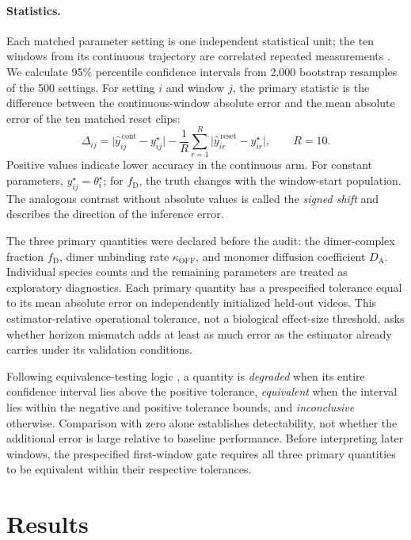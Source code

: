 \documentclass{article}
\newcommand{\fD}{f_{\mathrm{D}}}
\newcommand{\DA}{D_{\mathrm{A}}}
\newcommand{\koff}{\kappa_{\mathrm{OFF}}}
\begin{document}
\paragraph{Statistics.} Each matched parameter setting is one independent
statistical unit; the ten windows from its continuous trajectory are
correlated repeated measurements
\citep{lazic2010pseudoreplication}. We calculate 95\% percentile confidence
intervals from 2,000 bootstrap resamples of the 500 settings. For setting
$i$ and window $j$, the primary statistic is the difference between the
continuous-window absolute error and the mean absolute error of the ten
matched reset clips:
%
\begin{equation}
\Delta_{ij}
= \bigl|\hat y^{\,\mathrm{cont}}_{ij} - y^{\star}_{ij}\bigr|
- \frac{1}{R}\sum_{r=1}^{R}
  \bigl|\hat y^{\,\mathrm{reset}}_{ir} - y^{\star}_{ir}\bigr|,
\qquad R=10.
\label{eq:delta}
\end{equation}
%
Positive values indicate lower accuracy in the continuous arm. For constant
parameters, $y^{\star}_{ij}=\theta^{\star}_{i}$; for $\fD$, the truth changes
with the window-start population. The analogous contrast without absolute
values is called the \emph{signed shift} and describes the direction of the
inference error.

The three primary quantities were declared before the audit: the
dimer-complex fraction $\fD$, dimer unbinding rate $\koff$, and monomer
diffusion coefficient $\DA$. Individual species counts and the remaining
parameters are treated as exploratory diagnostics. Each primary quantity has
a prespecified tolerance equal to its mean absolute error on independently
initialized held-out videos. This estimator-relative operational tolerance, not a biological effect-size
threshold, asks whether horizon mismatch adds at least as much error as the
estimator already carries under its validation conditions.

Following equivalence-testing logic \citep{lakens2018equivalence}, a quantity
is \emph{degraded} when its entire confidence interval lies above the
positive tolerance, \emph{equivalent} when the interval lies within the
negative and positive tolerance bounds, and \emph{inconclusive} otherwise.
Comparison with zero alone establishes detectability, not whether the
additional error is large relative to baseline performance. Before
interpreting later windows, the prespecified first-window gate requires all
three primary quantities to be equivalent within their respective
tolerances.

\section{Results}
\label{sec:results}
\end{document}
